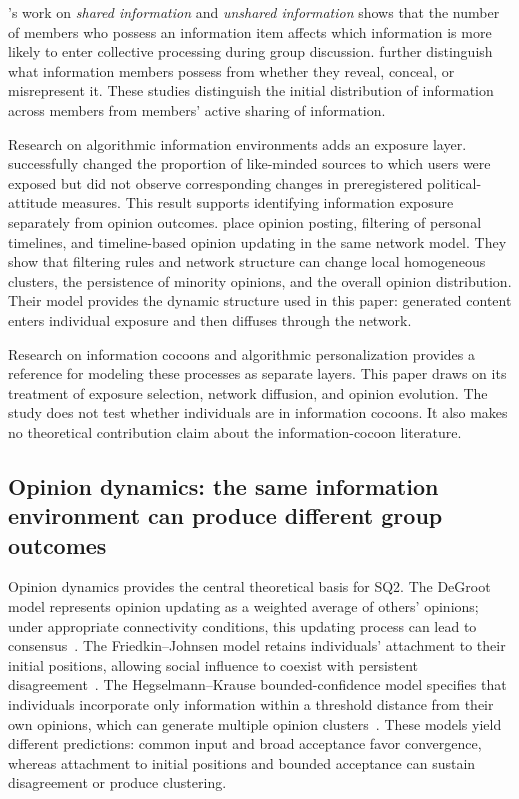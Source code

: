 \documentclass[11pt,a4paper]{article}
\newcommand{\term}[1]{\textit{#1}}
\begin{document}
\citet{stasser1985}'s work on \term{shared information} and \term{unshared information} shows that the number of members who possess an information item affects which information is more likely to enter collective processing during group discussion. \citet{steinel2010} further distinguish what information members possess from whether they reveal, conceal, or misrepresent it. These studies distinguish the initial distribution of information across members from members' active sharing of information.

Research on algorithmic information environments adds an exposure layer. \citet{nyhan2023} successfully changed the proportion of like-minded sources to which users were exposed but did not observe corresponding changes in preregistered political-attitude measures. This result supports identifying information exposure separately from opinion outcomes. \citet{perra2019} place opinion posting, filtering of personal timelines, and timeline-based opinion updating in the same network model. They show that filtering rules and network structure can change local homogeneous clusters, the persistence of minority opinions, and the overall opinion distribution. Their model provides the dynamic structure used in this paper: generated content enters individual exposure and then diffuses through the network.

Research on information cocoons and algorithmic personalization provides a reference for modeling these processes as separate layers. This paper draws on its treatment of exposure selection, network diffusion, and opinion evolution. The study does not test whether individuals are in information cocoons. It also makes no theoretical contribution claim about the information-cocoon literature.

\subsection{Opinion dynamics: the same information environment can produce different group outcomes}

Opinion dynamics provides the central theoretical basis for SQ2. The DeGroot model represents opinion updating as a weighted average of others' opinions; under appropriate connectivity conditions, this updating process can lead to consensus~\citep{degroot1974}. The Friedkin--Johnsen model retains individuals' attachment to their initial positions, allowing social influence to coexist with persistent disagreement~\citep{friedkin1990}. The Hegselmann--Krause bounded-confidence model specifies that individuals incorporate only information within a threshold distance from their own opinions, which can generate multiple opinion clusters~\citep{hegselmann2002}. These models yield different predictions: common input and broad acceptance favor convergence, whereas attachment to initial positions and bounded acceptance can sustain disagreement or produce clustering.
\end{document}
